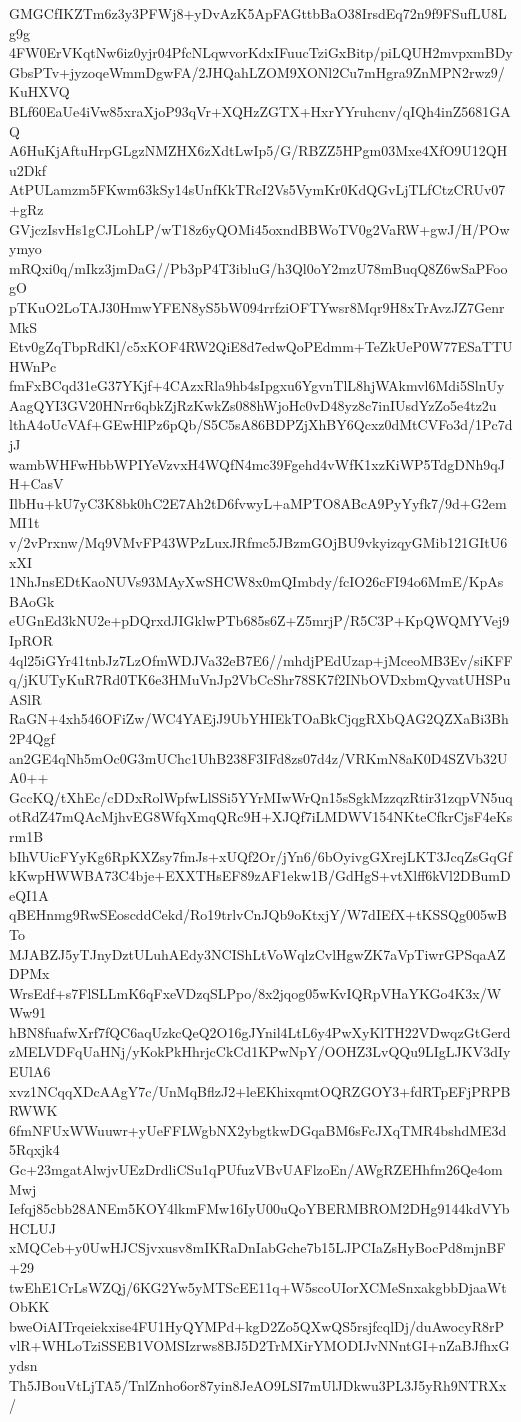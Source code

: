 GMGCfIKZTm6z3y3PFWj8+yDvAzK5ApFAGttbBaO38IrsdEq72n9f9FSufLU8Lg9g
4FW0ErVKqtNw6iz0yjr04PfcNLqwvorKdxIFuucTziGxBitp/piLQUH2mvpxmBDy
GbsPTv+jyzoqeWmmDgwFA/2JHQahLZOM9XONl2Cu7mHgra9ZnMPN2rwz9/KuHXVQ
BLf60EaUe4iVw85xraXjoP93qVr+XQHzZGTX+HxrYYruhcnv/qIQh4inZ5681GAQ
A6HuKjAftuHrpGLgzNMZHX6zXdtLwIp5/G/RBZZ5HPgm03Mxe4XfO9U12QHu2Dkf
AtPULamzm5FKwm63kSy14sUnfKkTRcI2Vs5VymKr0KdQGvLjTLfCtzCRUv07+gRz
GVjczIsvHs1gCJLohLP/wT18z6yQOMi45oxndBBWoTV0g2VaRW+gwJ/H/POwymyo
mRQxi0q/mIkz3jmDaG//Pb3pP4T3ibluG/h3Ql0oY2mzU78mBuqQ8Z6wSaPFoogO
pTKuO2LoTAJ30HmwYFEN8yS5bW094rrfziOFTYwsr8Mqr9H8xTrAvzJZ7GenrMkS
Etv0gZqTbpRdKl/c5xKOF4RW2QiE8d7edwQoPEdmm+TeZkUeP0W77ESaTTUHWnPc
fmFxBCqd31eG37YKjf+4CAzxRla9hb4sIpgxu6YgvnTlL8hjWAkmvl6Mdi5SlnUy
AagQYI3GV20HNrr6qbkZjRzKwkZs088hWjoHc0vD48yz8c7inIUsdYzZo5e4tz2u
lthA4oUcVAf+GEwHlPz6pQb/S5C5sA86BDPZjXhBY6Qcxz0dMtCVFo3d/1Pc7djJ
wambWHFwHbbWPIYeVzvxH4WQfN4mc39Fgehd4vWfK1xzKiWP5TdgDNh9qJH+CasV
IlbHu+kU7yC3K8bk0hC2E7Ah2tD6fvwyL+aMPTO8ABcA9PyYyfk7/9d+G2emMI1t
v/2vPrxnw/Mq9VMvFP43WPzLuxJRfmc5JBzmGOjBU9vkyizqyGMib121GItU6xXI
1NhJnsEDtKaoNUVs93MAyXwSHCW8x0mQImbdy/fcIO26cFI94o6MmE/KpAsBAoGk
eUGnEd3kNU2e+pDQrxdJIGklwPTb685s6Z+Z5mrjP/R5C3P+KpQWQMYVej9IpROR
4ql25iGYr41tnbJz7LzOfmWDJVa32eB7E6//mhdjPEdUzap+jMceoMB3Ev/siKFF
q/jKUTyKuR7Rd0TK6e3HMuVnJp2VbCcShr78SK7f2INbOVDxbmQyvatUHSPuASlR
RaGN+4xh546OFiZw/WC4YAEjJ9UbYHIEkTOaBkCjqgRXbQAG2QZXaBi3Bh2P4Qgf
an2GE4qNh5mOc0G3mUChc1UhB238F3IFd8zs07d4z/VRKmN8aK0D4SZVb32UA0++
GccKQ/tXhEc/cDDxRolWpfwLlSSi5YYrMIwWrQn15sSgkMzzqzRtir31zqpVN5uq
otRdZ47mQAcMjhvEG8WfqXmqQRc9H+XJQf7iLMDWV154NKteCfkrCjsF4eKsrm1B
bIhVUicFYyKg6RpKXZsy7fmJs+xUQf2Or/jYn6/6bOyivgGXrejLKT3JcqZsGqGf
kKwpHWWBA73C4bje+EXXTHsEF89zAF1ekw1B/GdHgS+vtXlff6kVl2DBumDeQI1A
qBEHnmg9RwSEoscddCekd/Ro19trlvCnJQb9oKtxjY/W7dIEfX+tKSSQg005wBTo
MJABZJ5yTJnyDztULuhAEdy3NCIShLtVoWqlzCvlHgwZK7aVpTiwrGPSqaAZDPMx
WrsEdf+s7FlSLLmK6qFxeVDzqSLPpo/8x2jqog05wKvIQRpVHaYKGo4K3x/WWw91
hBN8fuafwXrf7fQC6aqUzkcQeQ2O16gJYnil4LtL6y4PwXyKlTH22VDwqzGtGerd
zMELVDFqUaHNj/yKokPkHhrjcCkCd1KPwNpY/OOHZ3LvQQu9LIgLJKV3dIyEUlA6
xvz1NCqqXDcAAgY7c/UnMqBflzJ2+leEKhixqmtOQRZGOY3+fdRTpEFjPRPBRWWK
6fmNFUxWWuuwr+yUeFFLWgbNX2ybgtkwDGqaBM6sFcJXqTMR4bshdME3d5Rqxjk4
Gc+23mgatAlwjvUEzDrdliCSu1qPUfuzVBvUAFlzoEn/AWgRZEHhfm26Qe4omMwj
Iefqj85cbb28ANEm5KOY4lkmFMw16IyU00uQoYBERMBROM2DHg9144kdVYbHCLUJ
xMQCeb+y0UwHJCSjvxusv8mIKRaDnIabGche7b15LJPCIaZsHyBocPd8mjnBF+29
twEhE1CrLsWZQj/6KG2Yw5yMTScEE11q+W5scoUIorXCMeSnxakgbbDjaaWtObKK
bweOiAITrqeiekxise4FU1HyQYMPd+kgD2Zo5QXwQS5rsjfcqlDj/duAwocyR8rP
vlR+WHLoTziSSEB1VOMSIzrws8BJ5D2TrMXirYMODIJvNNntGI+nZaBJfhxGydsn
Th5JBouVtLjTA5/TnlZnho6or87yin8JeAO9LSI7mUlJDkwu3PL3J5yRh9NTRXx/
